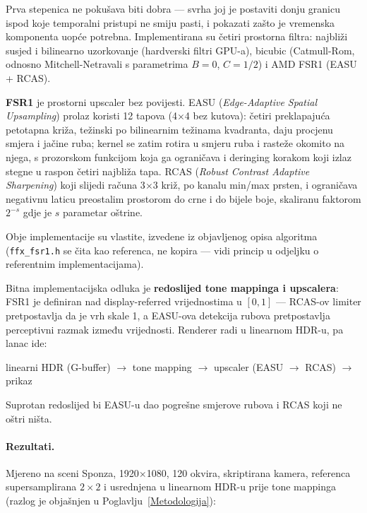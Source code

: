 \documentclass{mathos}
\begin{document}
Prva stepenica ne pokušava biti dobra — svrha joj je postaviti donju granicu
ispod koje temporalni pristupi ne smiju pasti, i pokazati zašto je vremenska
komponenta uopće potrebna. Implementirana su četiri prostorna filtra:
najbliži susjed i bilinearno uzorkovanje (hardverski filtri GPU-a), bicubic
(Catmull-Rom, odnosno Mitchell-Netravali s parametrima $B=0$, $C=1/2$) i AMD
FSR1 (EASU + RCAS).

\textbf{FSR1} je prostorni upscaler bez povijesti. EASU (\emph{Edge-Adaptive
Spatial Upsampling}) prolaz koristi 12 tapova (4$\times$4 bez kutova): četiri
preklapajuća petotapna križa, težinski po bilinearnim težinama kvadranta, daju
procjenu smjera i jačine ruba; kernel se zatim rotira u smjeru ruba i rasteže
okomito na njega, s prozorskom funkcijom koja ga ograničava i deringing
korakom koji izlaz stegne u raspon četiri najbliža tapa. RCAS (\emph{Robust
Contrast Adaptive Sharpening}) koji slijedi računa 3$\times$3 križ, po kanalu
min/max prsten, i ograničava negativnu laticu preostalim prostorom do crne i
do bijele boje, skaliranu faktorom $2^{-s}$ gdje je $s$ parametar oštrine.

Obje implementacije su vlastite, izvedene iz objavljenog opisa algoritma
(\verb+ffx_fsr1.h+ se čita kao referenca, ne kopira — vidi princip u odjeljku
o referentnim implementacijama).

Bitna implementacijska odluka je \textbf{redoslijed tone mappinga i
upscalera}: FSR1 je definiran nad display-referred vrijednostima u
$[0,1]$ — RCAS-ov limiter pretpostavlja da je vrh skale 1, a EASU-ova detekcija
rubova pretpostavlja perceptivni razmak između vrijednosti. Renderer radi u
linearnom HDR-u, pa lanac ide:
\begin{center}
linearni HDR (G-buffer) $\to$ tone mapping $\to$ upscaler (EASU $\to$ RCAS) $\to$ prikaz
\end{center}
Suprotan redoslijed bi EASU-u dao pogrešne smjerove rubova i RCAS koji ne
oštri ništa.

\paragraph{Rezultati.} Mjereno na sceni Sponza, 1920$\times$1080, 120 okvira,
skriptirana kamera, referenca supersamplirana $2\times2$ i usrednjena u
linearnom HDR-u prije tone mappinga (razlog je objašnjen u
Poglavlju~\ref{Metodologija}):
\end{document}
